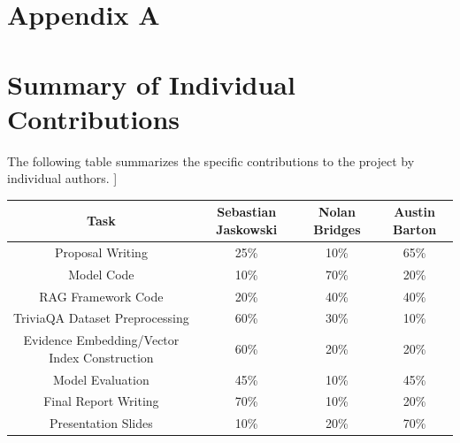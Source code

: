 \documentclass[11pt]{article}
\begin{document}
\section*{Appendix A}
\appendix{}
\section{Summary of Individual Contributions}
The following table summarizes the specific contributions to the project by individual authors.
\newline
]
\begin{table}[h]
    \centering
    \begin{tabular}{|c|c|c|c|} 
     \hline
     Task & Sebastian Jaskowski & Nolan Bridges & Austin Barton \\
     \hline
     \hline
     Proposal Writing  &25\% & 10\% & 65\% \\
     \hline
     Model Code & 10\% & 70\% & 20\% \\
     \hline
     RAG Framework Code & 20\% & 40\% & 40\% \\
     \hline
     TriviaQA Dataset Preprocessing & 60\% & 30\% & 10\%\\
     \hline
     Evidence Embedding/Vector Index Construction & 60\% & 20\% & 20\%\\
     \hline
     Model Evaluation & 45\% & 10\% & 45\%\\
     \hline
     Final Report Writing & 70\% & 10\% & 20\% \\
     \hline
     Presentation Slides & 10\% & 20\% & 70\%\\
     \hline
    \end{tabular}
\end{table}
\end{document}
